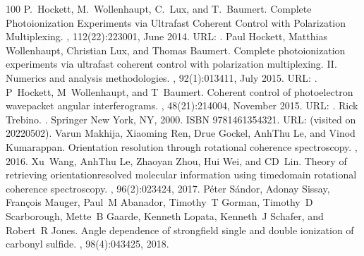 \documentclass[letterpaper,table,10pt,english]{jupyterBook}
\begin{document}
\begin{sphinxthebibliography}{100}
\sphinxAtStartPar
P. Hockett, M. Wollenhaupt, C. Lux, and T. Baumert. Complete Photoionization Experiments via Ultrafast Coherent Control with Polarization Multiplexing. , 112(22):223001, June 2014. URL: .
\sphinxAtStartPar
Paul Hockett, Matthias Wollenhaupt, Christian Lux, and Thomas Baumert. Complete photoionization experiments via ultrafast coherent control with polarization multiplexing. II. Numerics and analysis methodologies. , 92(1):013411, July 2015. URL: .
\sphinxAtStartPar
P Hockett, M Wollenhaupt, and T Baumert. Coherent control of photoelectron wavepacket angular interferograms. , 48(21):214004, November 2015. URL: .
\sphinxAtStartPar
Rick Trebino. . Springer New York, NY, 2000. ISBN 978\sphinxhyphen{}1\sphinxhyphen{}4613\sphinxhyphen{}5432\sphinxhyphen{}1. URL:  (visited on 2022\sphinxhyphen{}05\sphinxhyphen{}02).
\sphinxAtStartPar
Varun Makhija, Xiaoming Ren, Drue Gockel, Anh\sphinxhyphen{}Thu Le, and Vinod Kumarappan. Orientation resolution through rotational coherence spectroscopy. , 2016.
\sphinxAtStartPar
Xu Wang, Anh\sphinxhyphen{}Thu Le, Zhaoyan Zhou, Hui Wei, and CD Lin. Theory of retrieving orientation\sphinxhyphen{}resolved molecular information using time\sphinxhyphen{}domain rotational coherence spectroscopy. , 96(2):023424, 2017.
\sphinxAtStartPar
Péter Sándor, Adonay Sissay, François Mauger, Paul M Abanador, Timothy T Gorman, Timothy D Scarborough, Mette B Gaarde, Kenneth Lopata, Kenneth J Schafer, and Robert R Jones. Angle dependence of strong\sphinxhyphen{}field single and double ionization of carbonyl sulfide. , 98(4):043425, 2018.

\end{sphinxthebibliography}
\end{document}
